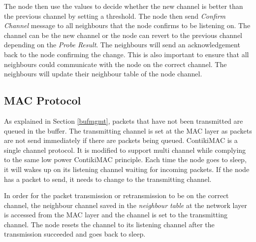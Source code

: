The node then use the values to decide whether the new channel is better than the previous channel by setting a threshold. The node then send \textit{Confirm Channel} message to all neighbours that the node confirms to be listening on. The channel can be the new channel or the node can revert to the previous channel depending on the \textit{Probe Result}. The neighbours will send an acknowledgement back to the node confirming the change. This is also important to ensure that all neighbours could communicate with the node on the correct channel. The neighbours will update their neighbour table of the node channel. 

\subsection{MAC Protocol}
As explained in Section \ref{bufmgmt}, packets that have not been transmitted are queued in the buffer. The transmitting channel is set at the MAC layer as packets are not send immediately if there are packets being queued. ContikiMAC is a single channel protocol. It is modified to support multi channel while complying to the same low power ContikiMAC principle. Each time the node goes to sleep, it will wakes up on its listening channel waiting for incoming packets. If the node has a packet to send, it needs to change to the transmitting channel.

In order for the packet transmission or retransmission to be on the correct channel, the neighbour channel saved in the \textit{neighbour table} at the network layer is accessed from the MAC layer and the channel is set to the transmitting channel. The node resets the channel to its listening channel after the transmission succeeded and goes back to sleep.

